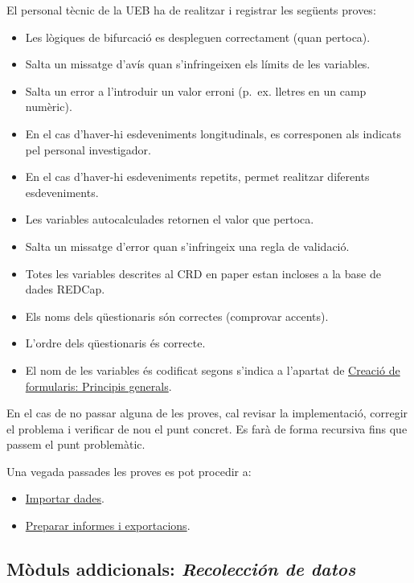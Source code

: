 \documentclass[
]{article}
\providecommand{\tightlist}{%
  \setlength{\itemsep}{0pt}\setlength{\parskip}{0pt}}
\begin{document}
El personal tècnic de la UEB ha de realitzar i registrar les següents proves:

\begin{itemize}
\tightlist
\item
  Les lògiques de bifurcació es despleguen correctament (quan pertoca).
\item
  Salta un missatge d'avís quan s'infringeixen els límits de les variables.
\item
  Salta un error a l'introduir un valor erroni (p.~ex. lletres en un camp numèric).
\item
  En el cas d'haver-hi esdeveniments longitudinals, es corresponen als indicats pel personal investigador.
\item
  En el cas d'haver-hi esdeveniments repetits, permet realitzar diferents esdeveniments.
\item
  Les variables autocalculades retornen el valor que pertoca.
\item
  Salta un missatge d'error quan s'infringeix una regla de validació.
\item
  Totes les variables descrites al CRD en paper estan incloses a la base de dades REDCap.
\item
  Els noms dels qüestionaris són correctes (comprovar accents).
\item
  L'ordre dels qüestionaris és correcte.
\item
  El nom de les variables és codificat segons s'indica a l'apartat de \protect\hyperlink{en7}{Creació de formularis: Principis generals}.
\end{itemize}

En el cas de no passar alguna de les proves, cal revisar la implementació, corregir el problema i verificar de nou el punt concret. Es farà de forma recursiva fins que passem el punt problemàtic.

Una vegada passades les proves es pot procedir a:

\begin{itemize}
\tightlist
\item
  \protect\hyperlink{en8}{Importar dades}.
\item
  \protect\hyperlink{en9}{Preparar informes i exportacions}.
\end{itemize}

\hypertarget{muxf2duls-addicionals-recolecciuxf3n-de-datos}{%
\subsection{\texorpdfstring{\textbf{Mòduls addicionals}: \emph{Recolección de datos}}{Mòduls addicionals: Recolección de datos}}\label{muxf2duls-addicionals-recolecciuxf3n-de-datos}}
\end{document}
